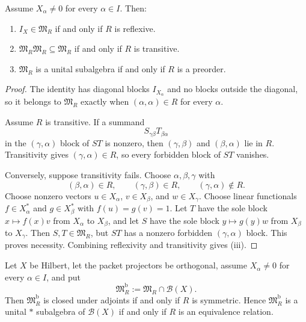 \begin{theorem}
\label{thm:support-pattern}
Assume $X_\alpha\neq0$ for every $\alpha\in I$.  Then:
\begin{enumerate}[label=(\roman*)]
\item $I_X\in\mathfrak M_R$ if and only if $R$ is reflexive.
\item $\mathfrak M_R\mathfrak M_R\subseteq\mathfrak M_R$ if and only if $R$ is transitive.
\item $\mathfrak M_R$ is a unital subalgebra if and only if $R$ is a preorder.
\end{enumerate}
\end{theorem}

\begin{proof}
The identity has diagonal blocks $I_{X_\alpha}$ and no blocks outside the diagonal, so it belongs to $\mathfrak M_R$ exactly when $(\alpha,\alpha)\in R$ for every $\alpha$.

Assume $R$ is transitive.  If a summand
\[
S_{\gamma\beta}T_{\beta\alpha}
\]
in the $(\gamma,\alpha)$ block of $ST$ is nonzero, then $(\gamma,\beta)$ and $(\beta,\alpha)$ lie in $R$.  Transitivity gives $(\gamma,\alpha)\in R$, so every forbidden block of $ST$ vanishes.

Conversely, suppose transitivity fails.  Choose $\alpha,\beta,\gamma$ with
\[
(\beta,\alpha)\in R,
\qquad
(\gamma,\beta)\in R,
\qquad
(\gamma,\alpha)\notin R.
\]
Choose nonzero vectors $u\in X_\alpha$, $v\in X_\beta$, and $w\in X_\gamma$.  Choose linear functionals $f\in X_\alpha^*$ and $g\in X_\beta^*$ with $f(u)=g(v)=1$.  Let $T$ have the sole block $x\mapsto f(x)v$ from $X_\alpha$ to $X_\beta$, and let $S$ have the sole block $y\mapsto g(y)w$ from $X_\beta$ to $X_\gamma$.  Then $S,T\in\mathfrak M_R$, but $ST$ has a nonzero forbidden $(\gamma,\alpha)$ block.  This proves necessity.  Combining reflexivity and transitivity gives (iii).
\end{proof}

\begin{corollary}
\label{cor:star-support}
Let $X$ be Hilbert, let the packet projectors be orthogonal, assume $X_\alpha\neq0$ for every $\alpha\in I$, and put
\[
\mathfrak M_R^{\mathrm b}:=\mathfrak M_R\cap\mathcal B(X).
\]
Then $\mathfrak M_R^{\mathrm b}$ is closed under adjoints if and only if $R$ is symmetric.  Hence $\mathfrak M_R^{\mathrm b}$ is a unital $*$ subalgebra of $\mathcal B(X)$ if and only if $R$ is an equivalence relation.
\end{corollary}

